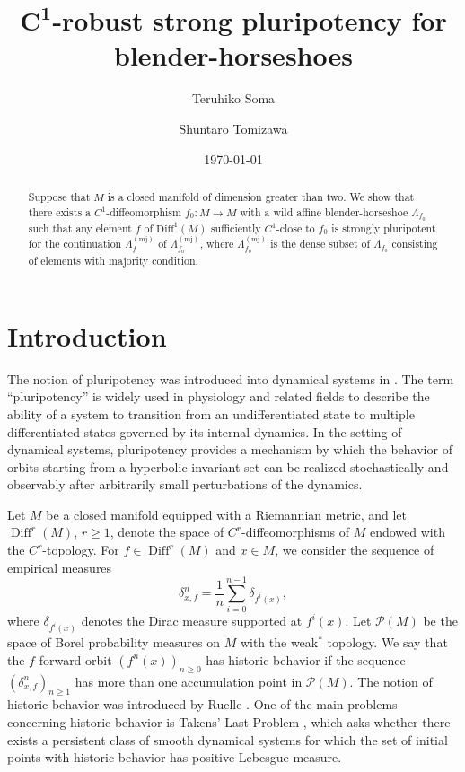 \documentclass{amsart}
\title[$\boldsymbol{C^1}$-robust strong pluripotency for blender-horseshoes]{$\boldsymbol{C^1}$-robust  strong pluripotency for blender-horseshoes}
\date{\today}
\author{Teruhiko Soma}
\author{Shuntaro Tomizawa}
\theoremstyle{plain}
\theoremstyle{definition}
\numberwithin{equation}{section}
\numberwithin{figure}{section}
\begin{document}
\maketitle


\begin{abstract}
Suppose that $M$ is a closed manifold of dimension greater than two.
We show that there exists a $C^1$-diffeomorphism $f_0:M\longrightarrow M$ with 
a wild affine blender-horseshoe $\Lambda_{f_0}$ 
such that any element $f$ of $\mathrm{Diff}^1(M)$ sufficiently $C^1$-close to $f_0$ is strongly pluripotent for the continuation $\Lambda_f^{(\mathrm{mj})}$ of $\Lambda_{f_0}^{(\mathrm{mj})}$, 
where $\Lambda_{f_0}^{(\mathrm{mj})}$ is the dense subset of $\Lambda_{f_0}$ 
consisting of elements with majority condition.
\end{abstract}





\section{Introduction}




The notion of pluripotency was introduced into dynamical systems in
\cite{KNS}. The term ``pluripotency'' is widely used in physiology and
related fields to describe the ability of a system to transition from an
undifferentiated state to multiple differentiated states governed by its
internal dynamics. In the setting of dynamical systems, pluripotency provides
a mechanism by which the behavior of orbits starting from a hyperbolic
invariant set can be realized stochastically and observably after arbitrarily
small perturbations of the dynamics.

Let $M$ be a closed manifold equipped with a Riemannian metric, and let
$\operatorname{Diff}^{r}(M)$, $r\geq 1$, denote the space of
$C^{r}$-diffeomorphisms of $M$ endowed with the $C^{r}$-topology. For
$f\in\operatorname{Diff}^{r}(M)$ and $x\in M$, we consider the sequence of
empirical measures
\begin{equation}
 \delta_{x,f}^{n}
 =
 \frac{1}{n}\sum_{i=0}^{n-1}\delta_{f^{i}(x)},
 \label{eqn_empirical}
\end{equation}
where $\delta_{f^{i}(x)}$ denotes the Dirac measure supported at $f^{i}(x)$.
Let $\mathcal{P}(M)$ be the space of Borel probability measures on $M$ with
the weak$^*$ topology. We say that the $f$-forward orbit
$(f^{n}(x))_{n\geq 0}$ has historic behavior if the sequence
$(\delta_{x,f}^{n})_{n\geq 1}$ has more than one accumulation point in
$\mathcal{P}(M)$. The notion of historic behavior was introduced by Ruelle
\cite{R01}. One of the main problems concerning historic behavior is
Takens' Last Problem \cite{T08}, which asks whether there exists a persistent
class of smooth dynamical systems for which the set of initial points with
historic behavior has positive Lebesgue measure.
\end{document}
